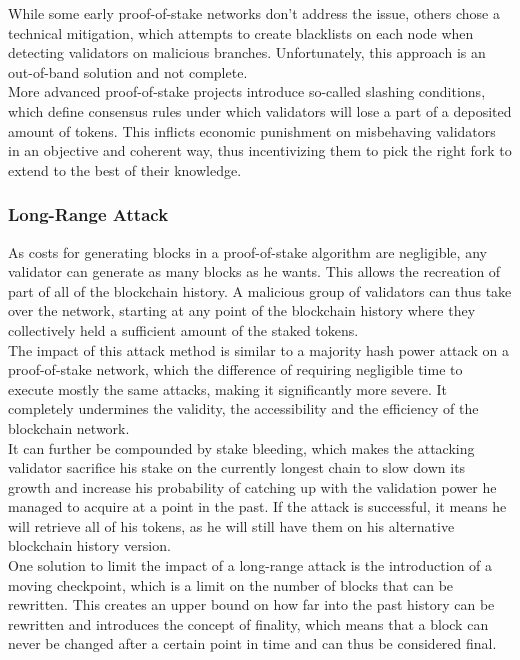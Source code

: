 \documentclass[12pt,a4paper]{article}
\begin{document}
While some early proof-of-stake networks don't address the issue, others chose a technical mitigation, which attempts to create blacklists on each node when detecting validators on malicious branches. Unfortunately, this approach is an out-of-band solution and not complete.\\

More advanced proof-of-stake projects introduce so-called slashing conditions,  which define consensus rules under which validators will lose a part of a deposited amount of tokens. This inflicts economic punishment on misbehaving validators in an objective and coherent way, thus incentivizing them to pick the right fork to extend to the best of their knowledge.\\

\subsubsection{Long-Range Attack}

As costs for generating blocks in a proof-of-stake algorithm are negligible, any validator can generate as many blocks as he wants. This allows the recreation of part of all of the blockchain history. A malicious group of validators can thus take over the network, starting at any point of the blockchain history where they collectively held a sufficient amount of the staked tokens.\\

The impact of this attack method is similar to a majority hash power attack on a proof-of-stake network, which the difference of requiring negligible time to execute mostly the same attacks, making it significantly more severe. It completely undermines the validity, the accessibility and the efficiency of the blockchain network.\\

It can further be compounded by stake bleeding, which makes the attacking validator sacrifice his stake on the currently longest chain to slow down its growth and increase his probability of catching up with the validation power he managed to acquire at a point in the past. If the attack is successful, it means he will retrieve all of his tokens, as he will still have them on his alternative blockchain history version.\\

One solution to limit the impact of a long-range attack is the introduction of a moving checkpoint, which is a limit on the number of blocks that can be rewritten. This creates an upper bound on how far into the past history can be rewritten and introduces the concept of finality, which means that a block can never be changed after a certain point in time and can thus be considered final.\\
\end{document}
